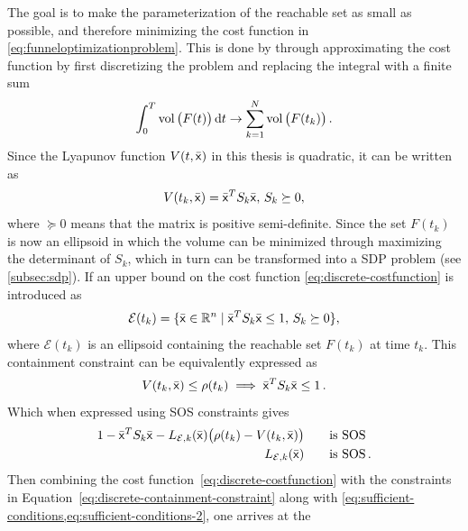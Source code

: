 The goal is to make the parameterization of the reachable set as small as
possible, and therefore minimizing the cost function in
\cref{eq:funneloptimizationproblem}. This is done by \textcite{Tobenkin_2011}
through approximating the cost function by first discretizing the problem and
replacing the integral with a finite sum
\begin{equation}
  \int_{0}^{T} \operatorname{vol}\big( F(t) \big) \, \mathrm{d}t \rightarrow \sum_{k=1}^{N} \operatorname{vol}\big( F(t_{k}) \big) \, . \label{eq:discrete-costfunction}
\end{equation}
Since the Lyapunov function \(V(t,\bar{{\mathbf{\mathsf{x}}}})\) in this thesis is quadratic,
it can be written as
\begin{equation}
  V(t_{k}, \bar{{\mathbf{\mathsf{x}}}}) = {\bar{{\mathbf{\mathsf{x}}}}}^{T}S_{k}\bar{{\mathbf{\mathsf{x}}}}, \, S_{k} \succeq 0,
\end{equation}
where \(\succeq 0\) means that the matrix is positive semi-definite. Since the
set \(F(t_{k})\) is now an ellipsoid in which the volume can be minimized
through maximizing the determinant of \(S_{k}\), which in turn can be
transformed into a \acl{SDP} problem (see \cref{subsec:sdp}). If an upper bound
on the cost function \cref{eq:discrete-costfunction} is introduced as
\begin{equation}
  \mathcal{E} (t_{k}) = \lbrace\bar{{\mathbf{\mathsf{x}}}} \in \mathbb{R}^n \mid {\bar{{\mathbf{\mathsf{x}}}}}^{T}S_{k}\bar{{\mathbf{\mathsf{x}}}} \leq 1, \, S_{k} \succeq 0\rbrace,
\end{equation}
where \( \mathcal{E} ( t_{k} ) \) is an ellipsoid containing the reachable set
\( F ( t_{k} ) \) at time \( t_{k} \). This containment constraint can be
equivalently expressed as
\begin{equation}
  V ( t_{k}, \bar{{\mathbf{\mathsf{x}}}} ) \leq \rho(t_{k})  \implies {\bar{{\mathbf{\mathsf{x}}}}}^{T}S_{k}\bar{{\mathbf{\mathsf{x}}}} \leq 1 \, .
  \label{eq:discrete-containment-constraint}
\end{equation}
Which when expressed using \ac{SOS} constraints gives
\begin{align}
  1 - {\bar{{\mathbf{\mathsf{x}}}}}^{T}S_{k}\bar{{\mathbf{\mathsf{x}}}} - L_{\mathcal{E},k}(\bar{{\mathbf{\mathsf{x}}}}) \big( \rho(t_{k}) - V(t_{k}, \bar{{\mathbf{\mathsf{x}}}}) \big)  \qquad \text{is SOS}& \\
  L_{\mathcal{E},k}(\bar{{\mathbf{\mathsf{x}}}}) \qquad \text{is SOS}& \, . \nonumber
\end{align}
%
Then combining the cost function~\eqref{eq:discrete-costfunction} with the
constraints in Equation~\eqref{eq:discrete-containment-constraint} along with
\cref{eq:sufficient-conditions,eq:sufficient-conditions-2}, one arrives at the
